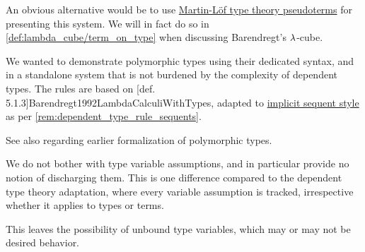 \begin{comments}
  \item An obvious alternative would be to use \hyperref[def:mltt_pseudoterm]{Martin-L\"of type theory pseudoterms} for presenting this system. We will in fact do so in \cref{def:lambda_cube/term_on_type} when discussing Barendregt's \( {\mathrm \lambda} \)-cube.

  We wanted to demonstrate polymorphic types using their dedicated syntax, and in a standalone system that is not burdened by the complexity of dependent types. The rules are based on [def. 5.1.3]{Barendregt1992LambdaCalculiWithTypes}, adapted to \hyperref[rem:natural_deduction_explicit_sequents]{implicit sequent style} as per \cref{rem:dependent_type_rule_sequents}.

  See also  regarding earlier formalization of polymorphic types.

  \item We do not bother with type variable assumptions, and in particular provide no notion of discharging them. This is one difference compared to the dependent type theory adaptation, where every variable assumption is tracked, irrespective whether it applies to types or terms.

  This leaves the possibility of unbound type variables, which may or may not be desired behavior.
\end{comments}

